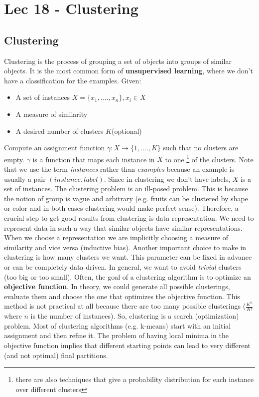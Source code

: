 \chapter{Lec 18 - Clustering}

\section{Clustering}
Clustering is the process of grouping a set of objects into groups of similar objects. It is the most common form of \textbf{unsupervised learning}, where we don't have a classification for the examples.\newline\newline
Given:
\begin{itemize}
    \item A set of instances $X = \{x_{1},....,x_{n}\}, x_{i} \in X$
    \item A measure of similarity
    \item A desired number of clusters $K$(optional)
\end{itemize}
Compute an assignment function $\gamma : X \rightarrow \{1,....,K\}$ such that no clusters are empty. $\gamma$ is a function that maps each instance in $X$ to one \footnote{there are also techniques that give a probability distribution for each instance over different clusters} of the clusters. Note that we use the term \textit{instances} rather than \textit{examples} because an example is usually a pair $(instance, label)$. Since in clustering we don't have labels, $X$ is a set of instances.\newline\newline
The clustering problem is an ill-posed problem. This is because the notion of group is vague and arbitrary (e.g. fruits can be clustered by shape or color and in both cases clustering would make perfect sense). Therefore, a crucial step to get good results from clustering is data representation. We need to represent data in such a way that similar objects have similar representations. When we choose a representation we are implicitly choosing a measure of similarity and vice versa (inductive bias). Another important choice to make in clustering is how many clusters we want. This parameter can be fixed in advance or can be completely data driven. In general, we want to avoid \textit{trivial} clusters (too big or too small).\newline\newline
Often, the goal of a clustering algorithm is to optimize an \textbf{objective function}. In theory, we could generate all possible clusterings, evaluate them and choose the one that optimizes the objective function. This method is not practical at all because there are too many possible clusterings ($\frac{K^{n}}{K!}$ where $n$ is the number of instances). So, clustering is a search (optimization) problem.\newline\newline
Most of clustering algorithms (e.g. k-means) start with an initial assignment and then refine it. The problem of having local minima in the objective function implies that different starting points can lead to very different (and not optimal) final partitions.

